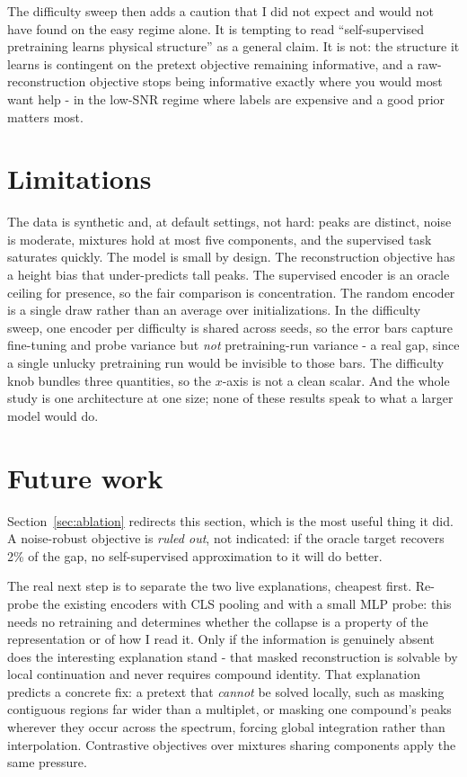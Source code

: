 \documentclass[11pt]{article}
\begin{document}
The difficulty sweep then adds a caution that I did not expect and would not have found on the
easy regime alone. It is tempting to read ``self-supervised pretraining learns physical
structure'' as a general claim. It is not: the structure it learns is contingent on the
pretext objective remaining informative, and a raw-reconstruction objective stops being
informative exactly where you would most want help - in the low-SNR regime where labels are
expensive and a good prior matters most.

\section{Limitations}

The data is synthetic and, at default settings, not hard: peaks are distinct, noise is
moderate, mixtures hold at most five components, and the supervised task saturates quickly.
The model is small by design. The reconstruction objective has a height bias that
under-predicts tall peaks. The supervised encoder is an oracle ceiling for presence, so the
fair comparison is concentration. The random encoder is a single draw rather than an average
over initializations. In the difficulty sweep, one encoder per difficulty is shared across
seeds, so the error bars capture fine-tuning and probe variance but \emph{not}
pretraining-run variance - a real gap, since a single unlucky pretraining run would be
invisible to those bars. The difficulty knob bundles three quantities, so the $x$-axis is not
a clean scalar. And the whole study is one architecture at one size; none of these results
speak to what a larger model would do.

\section{Future work}

Section~\ref{sec:ablation} redirects this section, which is the most useful thing it did. A
noise-robust objective is \emph{ruled out}, not indicated: if the oracle target recovers 2\% of
the gap, no self-supervised approximation to it will do better.

The real next step is to separate the two live explanations, cheapest first. Re-probe the
existing encoders with CLS pooling and with a small MLP probe: this needs no retraining and
determines whether the collapse is a property of the representation or of how I read it. Only
if the information is genuinely absent does the interesting explanation stand - that masked
reconstruction is solvable by local continuation and never requires compound identity. That
explanation predicts a concrete fix: a pretext that \emph{cannot} be solved locally, such as
masking contiguous regions far wider than a multiplet, or masking one compound's peaks wherever
they occur across the spectrum, forcing global integration rather than interpolation.
Contrastive objectives over mixtures sharing components apply the same pressure.
\end{document}
